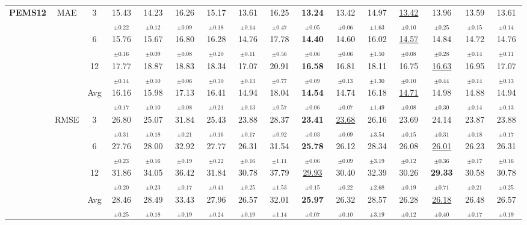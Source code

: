 \begin{table}[t]
{\begin{tabular}{ccc|ccc|cccc|cccc|cc}
\midrule
\multirow{12}{*}{\textbf{PEMS12}} & \multirow{4}{*}{MAE} & 3 & 15.43$_{\pm0.22}$ & 14.23$_{\pm0.12}$ & 16.26$_{\pm0.09}$ & 15.17$_{\pm0.18}$ & 13.61$_{\pm0.14}$ & 16.25$_{\pm0.47}$ & \textbf{13.24$_{\pm0.05}$} & 13.42$_{\pm0.06}$ & 14.97$_{\pm1.63}$ & \underline{13.42$_{\pm0.10}$} & 13.96$_{\pm0.25}$ & 13.59$_{\pm0.15}$ & 13.61$_{\pm0.14}$ \\
 &  & 6 & 15.76$_{\pm0.16}$ & 15.67$_{\pm0.09}$ & 16.80$_{\pm0.08}$ & 16.28$_{\pm0.20}$ & 14.76$_{\pm0.11}$ & 17.78$_{\pm0.56}$ & \textbf{14.40$_{\pm0.06}$} & 14.60$_{\pm0.06}$ & 16.02$_{\pm1.50}$ & \underline{14.57$_{\pm0.08}$} & 14.84$_{\pm0.28}$ & 14.72$_{\pm0.14}$ & 14.76$_{\pm0.11}$ \\
 &  & 12 & 17.77$_{\pm0.14}$ & 18.87$_{\pm0.10}$ & 18.83$_{\pm0.06}$ & 18.34$_{\pm0.30}$ & 17.07$_{\pm0.13}$ & 20.91$_{\pm0.77}$ & \textbf{16.58$_{\pm0.09}$} & 16.81$_{\pm0.13}$ & 18.11$_{\pm1.30}$ & 16.75$_{\pm0.10}$ & \underline{16.63$_{\pm0.44}$} & 16.95$_{\pm0.14}$ & 17.07$_{\pm0.13}$ \\
 &  & Avg & 16.16$_{\pm0.17}$ & 15.98$_{\pm0.10}$ & 17.13$_{\pm0.08}$ & 16.41$_{\pm0.21}$ & 14.94$_{\pm0.13}$ & 18.04$_{\pm0.57}$ & \textbf{14.54$_{\pm0.06}$} & 14.74$_{\pm0.07}$ & 16.18$_{\pm1.49}$ & \underline{14.71$_{\pm0.08}$} & 14.98$_{\pm0.30}$ & 14.88$_{\pm0.14}$ & 14.94$_{\pm0.13}$ \\
\cmidrule(lr){2-16}
 & \multirow{4}{*}{RMSE} & 3 & 26.80$_{\pm0.31}$ & 25.07$_{\pm0.18}$ & 31.84$_{\pm0.21}$ & 25.43$_{\pm0.16}$ & 23.88$_{\pm0.17}$ & 28.37$_{\pm0.92}$ & \textbf{23.41$_{\pm0.03}$} & \underline{23.68$_{\pm0.09}$} & 26.16$_{\pm3.54}$ & 23.69$_{\pm0.15}$ & 24.14$_{\pm0.31}$ & 23.87$_{\pm0.18}$ & 23.88$_{\pm0.17}$ \\
 &  & 6 & 27.76$_{\pm0.23}$ & 28.00$_{\pm0.16}$ & 32.92$_{\pm0.19}$ & 27.77$_{\pm0.22}$ & 26.31$_{\pm0.16}$ & 31.54$_{\pm1.11}$ & \textbf{25.78$_{\pm0.06}$} & 26.12$_{\pm0.09}$ & 28.34$_{\pm3.19}$ & 26.08$_{\pm0.12}$ & \underline{26.01$_{\pm0.36}$} & 26.23$_{\pm0.17}$ & 26.31$_{\pm0.16}$ \\
 &  & 12 & 31.86$_{\pm0.20}$ & 34.05$_{\pm0.23}$ & 36.42$_{\pm0.17}$ & 31.84$_{\pm0.41}$ & 30.78$_{\pm0.25}$ & 37.79$_{\pm1.53}$ & \underline{29.93$_{\pm0.15}$} & 30.40$_{\pm0.22}$ & 32.39$_{\pm2.68}$ & 30.26$_{\pm0.19}$ & \textbf{29.33$_{\pm0.71}$} & 30.58$_{\pm0.21}$ & 30.78$_{\pm0.25}$ \\
 &  & Avg & 28.46$_{\pm0.25}$ & 28.49$_{\pm0.18}$ & 33.43$_{\pm0.19}$ & 27.96$_{\pm0.24}$ & 26.57$_{\pm0.19}$ & 32.01$_{\pm1.14}$ & \textbf{25.97$_{\pm0.07}$} & 26.32$_{\pm0.10}$ & 28.57$_{\pm3.19}$ & 26.28$_{\pm0.12}$ & \underline{26.18$_{\pm0.40}$} & 26.48$_{\pm0.17}$ & 26.57$_{\pm0.19}$ \\

\end{tabular}}
\end{table}
